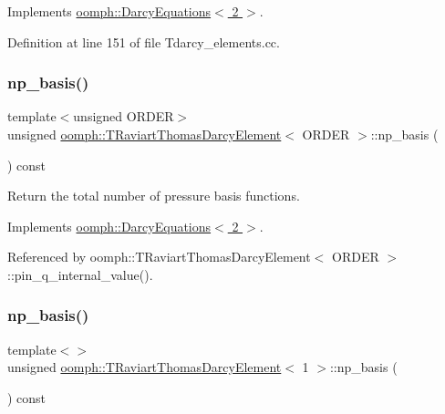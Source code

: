Implements \hyperlink{classoomph_1_1DarcyEquations_a2a27050f99b0dd3ab6686807fa84f866}{oomph\+::\+Darcy\+Equations$<$ 2 $>$}.



Definition at line 151 of file Tdarcy\+\_\+elements.\+cc.

\mbox{\label{classoomph_1_1TRaviartThomasDarcyElement_a73c28d7e3789db421c5c5eccc3e25581}} 
\subsubsection{\texorpdfstring{np\+\_\+basis()}{np\_basis()}\hspace{0.1cm}{\footnotesize\ttfamily [2/3]}}
{\footnotesize\ttfamily template$<$unsigned O\+R\+D\+ER$>$ \\
unsigned \hyperlink{classoomph_1_1TRaviartThomasDarcyElement}{oomph\+::\+T\+Raviart\+Thomas\+Darcy\+Element}$<$ O\+R\+D\+ER $>$\+::np\+\_\+basis (\begin{DoxyParamCaption}{ }\end{DoxyParamCaption}) const\hspace{0.3cm}{\ttfamily [virtual]}}



Return the total number of pressure basis functions. 



Implements \hyperlink{classoomph_1_1DarcyEquations_a2a27050f99b0dd3ab6686807fa84f866}{oomph\+::\+Darcy\+Equations$<$ 2 $>$}.



Referenced by oomph\+::\+T\+Raviart\+Thomas\+Darcy\+Element$<$ O\+R\+D\+E\+R $>$\+::pin\+\_\+q\+\_\+internal\+\_\+value().

\mbox{\label{classoomph_1_1TRaviartThomasDarcyElement_a1717d9e302ead84ad212bafd1cb86c9e}} 
\subsubsection{\texorpdfstring{np\+\_\+basis()}{np\_basis()}\hspace{0.1cm}{\footnotesize\ttfamily [3/3]}}
{\footnotesize\ttfamily template$<$$>$ \\
unsigned \hyperlink{classoomph_1_1TRaviartThomasDarcyElement}{oomph\+::\+T\+Raviart\+Thomas\+Darcy\+Element}$<$ 1 $>$\+::np\+\_\+basis (\begin{DoxyParamCaption}{ }\end{DoxyParamCaption}) const\hspace{0.3cm}{\ttfamily [virtual]}}



